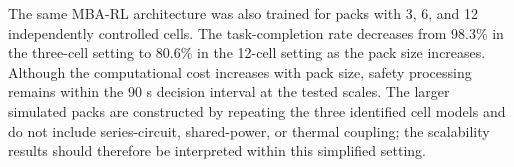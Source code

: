 The same MBA-RL architecture was also trained for packs with 3, 6, and 12 independently controlled cells. The task-completion rate decreases from 98.3\% in the three-cell setting to 80.6\% in the 12-cell setting as the pack size increases. Although the computational cost increases with pack size, safety processing remains within the 90 s decision interval at the tested scales. The larger simulated packs are constructed by repeating the three identified cell models and do not include series-circuit, shared-power, or thermal coupling; the scalability results should therefore be interpreted within this simplified setting.